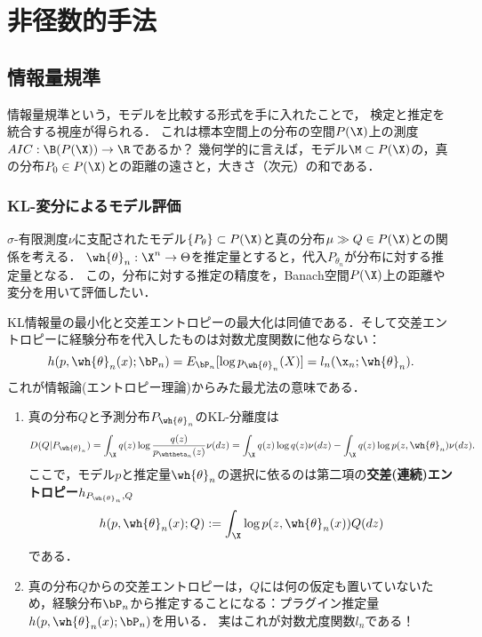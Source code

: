 \documentclass[uplatex,dvipdfmx]{jsreport}
\begin{document}
\chapter{非径数的手法}

\section{情報量規準}

\begin{tcolorbox}[colframe=ForestGreen, colback=ForestGreen!10!white,breakable,colbacktitle=ForestGreen!40!white,coltitle=black,fonttitle=\bfseries\sffamily,
title=]
    情報量規準という，モデルを比較する形式を手に入れたことで，
    検定と推定を統合する視座が得られる．
    これは標本空間上の分布の空間$P(\X)$上の測度$AIC:\B(P(\X))\to\R$であるか？
    幾何学的に言えば，モデル$\M\subset P(\X)$の，真の分布$P_0\in P(\X)$との距離の遠さと，大きさ（次元）の和である．
\end{tcolorbox}

\subsection{KL-変分によるモデル評価}

\begin{model}[パラメトリックモデルの評価]\label{model-for-evaluation-of-parametric-model}
    $\sigma$-有限測度$\nu$に支配されたモデル$\{P_\theta\}\subset P(\X)$と真の分布$\mu\gg Q\in P(\X)$との関係を考える．
    $\wh{\theta}_n:\X^n\to\Theta$を推定量とすると，代入$P_{\theta_n}$が分布に対する推定量となる．
    この，分布に対する推定の精度を，Banach空間$P(\X)$上の距離や変分を用いて評価したい．
\end{model}

\begin{example}
    KL情報量の最小化と交差エントロピーの最大化は同値である．そして交差エントロピーに経験分布を代入したものは対数尤度関数に他ならない：
    \[h(p,\wh{\theta}_n(x);\bP_n)=E_{\bP_n}[\log p_{\wh{\theta}_n}(X)]=l_n(\x_n;\wh{\theta}_n).\]
    これが情報論(エントロピー理論)からみた最尤法の意味である．
    \begin{enumerate}
        \item 真の分布$Q$と予測分布$P_{\wh{\theta}_n}$のKL-分離度は
        \[D(Q|P_{\wh{\theta}_n})=\int_\X q(z)\log\frac{q(z)}{p_{{\whtheta}_n}(z)}\nu(dz)=\int_\X q(z)\log q(z)\nu(dz)-\int_\X q(z)\log p(z,\wh{\theta}_n)\nu(dz).\]
        ここで，モデル$p$と推定量$\wh{\theta}_n$の選択に依るのは第二項の\textbf{交差(連続)エントロピー$h_{P_{\wh{\theta}_n},Q}$}
        \[h(p,\wh{\theta}_n(x);Q):=\int_\X\log p(z,\wh{\theta}_n(x))Q(dz)\]
        である．
        \item 真の分布$Q$からの交差エントロピーは，$Q$には何の仮定も置いていないため，経験分布$\bP_n$から推定することになる：プラグイン推定量$h(p,\wh{\theta}_n(x);\bP_n)$を用いる．
        実はこれが対数尤度関数$l_n$である！
    \end{enumerate}
\end{example}
\end{document}
